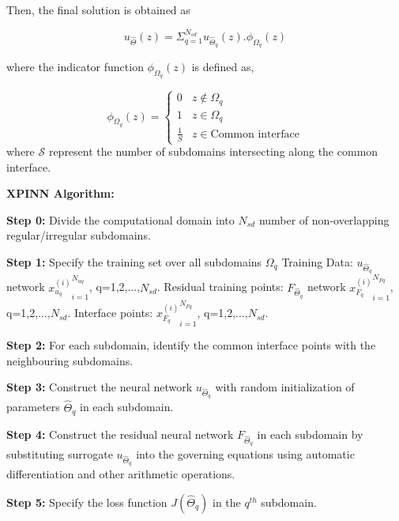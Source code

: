 \documentclass[conference,compsoc]{IEEEtran}
\begin{document}
Then, the final solution is obtained as

\begin{equation}
    u_{\hat{\Theta}}(z) = \Sigma_{q=1}^{N_{sd}} u_{\hat{\Theta}_q}(z).\phi_{\Omega_q}(z)
\end{equation}

where the indicator function $\phi_{\Omega_q}(z)$ is defined as,

\begin{equation}
    \phi_{\Omega_q}(z) = 
    \begin{cases} 
          0 & z \notin \Omega_q \\
          1 & z \in \Omega_q  \\
          \frac{1}{S} & z \in \textrm{Common interface}
    \end{cases}
\end{equation}
where $\mathcal{S}$ represent the number of subdomains intersecting along the common interface. \newline

\textbf{XPINN Algorithm\cite{jagtap2020extended}:}

\textbf{Step 0:} Divide the computational domain into $N_{sd}$ number of non-overlapping
regular/irregular subdomains.

\textbf{Step 1:} Specify the training set over all subdomains $\Omega_q$
\newline Training Data: $u_{\hat{\Theta}_q}$ network ${x_{u_q}^{(i)}}^{N_{uq}}_{i=1}$, q=1,2,...,$N_{sd}$.
\newline Residual training points: $F_{\hat{\Theta}_q}$ network ${x_{F_q}^{(i)}}^{N_{Fq}}_{i=1}$, q=1,2,...,$N_{sd}$.
\newline Interface points: ${x_{F_q}^{(i)}}^{N_{Fq}}_{i=1}$, q=1,2,...,$N_{sd}$.

\textbf{Step 2:} For each subdomain, identify the common interface points with the
neighbouring subdomains.

\textbf{Step 3:} Construct the neural network $u_{\hat{\Theta}_q}$  with random initialization of parameters $\hat{\Theta}_q$ in each subdomain.

\textbf{Step 4:} Construct the residual neural network $F_{\hat{\Theta}_q}$ in each subdomain by substituting surrogate $u_{\hat{\Theta}_q}$ into the governing equations using automatic differentiation and other arithmetic operations.

\textbf{Step 5:} Specify the loss function $J(\hat{\Theta}_q)$ in the $q^{th}$ subdomain.
\end{document}
